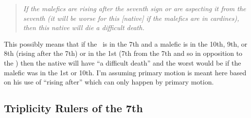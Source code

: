 \begin{quote}
\textsl{ If the malefics are rising after the seventh sign or are aspecting it from the seventh (it will be worse for this [native] if the malefics are in cardines), then this native will die a difficult death.}
\end{quote}

This possibly means that if the \Moon\, is in the 7th and a malefic is in the 10th, 9th, or 8th (rising after the 7th) or in the 1st (7th from the 7th and so in opposition to the \Moon) then the native will have ``a difficult death'' and the worst would be if the malefic was in the 1st or 10th. I'm assuming primary motion is meant here based on his use of ``rising after'' which can only happen by primary motion.

\subsection{Triplicity Rulers of the 7th}



